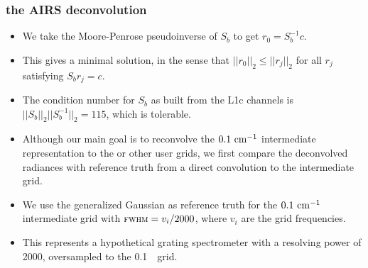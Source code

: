 \documentclass[10pt]{beamer}
\begin{document}
\begin{frame}
\frametitle{the AIRS deconvolution}
\begin{itemize}

  \item We take the Moore-Penrose pseudoinverse of $S_b$ to get $r_0
    = S_b^{-1} c$.

  \item This gives a minimal solution, in the sense that $||r_0||_2
     \le ||r_j||_2$ for all $r_j$ satisfying $S_b r_j = c$.  

  \item The condition number for $S_b$ as built from the L1c
    channels is $||S_b||_2||S_b^{-1}||_2 = 115$, which is tolerable.

  \item Although our main goal is to reconvolve the $0.1~\mbox{cm$^{-1}$}$
    intermediate representation to the {\cris} or other user grids,
    we first compare the deconvolved radiances with reference truth
    from a direct convolution to the intermediate grid.

  \item We use the generalized Gaussian as reference truth for the
    $0.1~\mbox{cm$^{-1}$}$ intermediate grid with ${\mbox{\small\textsc{fwhm}}} = v_i / 2000$, where
    $v_i$ are the grid frequencies.  

  \item This represents a hypothetical grating spectrometer with a
    resolving power of 2000, oversampled to the 0.1~\wn\ grid.

\end{itemize}
\end{frame}
\end{document}
